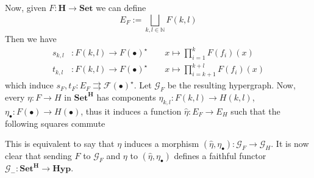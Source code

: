 \documentclass[a4paper,UKenglish,cleveref,pdftex,thm-restate,numberwithinsect]{lipics-v2021}
\newcommand{\cat}[1]{\ensuremath{\mathbf{#1}}}
\newcommand{\hyp}{\cat{Hyp}}
\begin{document}
Now, given $F:\cat{H}\to \cat{Set}$ we can define
\[E_F:=\bigsqcup_{k,l\in \mathbb{N}}F(k,l)\]
Then we have
\begin{align*}
	s_{k,l}&:F(k,l)\to F(\bullet)^{\star} \qquad x \mapsto \prod_{i=1}^{k}F(f_i)(x)\\
	t_{k,l}&:F(k,l)\to F(\bullet)^{\star} \qquad x \mapsto \prod_{i=k+1}^{k+l}F(f_i)(x)
\end{align*}
which induce
$s_F, t_F:E_F\rightrightarrows \mathcal{F}(\bullet)^{\star}$. Let $\mathcal{G}_F$ be the resulting hypergraph. Now, every $\eta:F\rightarrow H$ in $\cat{Set}^{\cat{H}}$ has components $\eta_{k,l}:F(k,l)\to H(k,l)$, $\eta_{\bullet}:F(\bullet)\to H(\bullet)$, thus it induces a function $\hat{\eta}:E_F\rightarrow E_H$ such that the following squares commute
\begin{center}
\end{center}
This is equivalent to say that $\eta$ induces a morphism $(\hat{\eta}, \eta_{\bullet}):\mathcal{G}_F\to \mathcal{G}_H$. It is now clear that sending $F$ to $\mathcal{G}_F$ and $\eta$ to $(\hat{\eta}, \eta_{\bullet})$ defines a faithful functor $\mathcal{G}_{-}:\cat{Set}^{\cat{H}}\to \hyp$.
\end{document}
